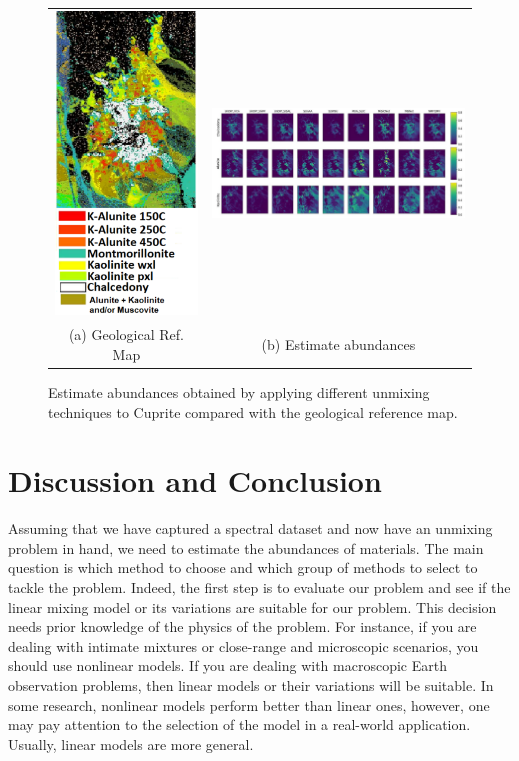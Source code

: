 \begin{figure}[h]
\centering
  \begin{tabular}{cc}
   \includegraphics[width=.14\textwidth]{fichiers_latex/Chap4/figs/Cuprite_GT_image3.pdf}&   \includegraphics[width=.75\textwidth]{fichiers_latex/Chap4/figs/Cuprite2.pdf}\\
 (a) Geological Ref. Map & (b) Estimate abundances
  \end{tabular}
  \caption{Estimate abundances obtained by applying different unmixing techniques to Cuprite compared with the geological reference map.}
\label{Real dataset}
\end{figure}

\section{Discussion and Conclusion}

Assuming that we have captured a spectral dataset and now have an unmixing problem in hand, we need to estimate the abundances of materials. The main question is which method to choose and which group of methods to select to tackle the problem. Indeed, the first step is to evaluate our problem and see if the linear mixing model or its variations are suitable for our problem. This decision needs prior knowledge of the physics of the problem. For instance, if you are dealing with intimate mixtures or close-range and microscopic scenarios, you should use nonlinear models. If you are dealing with macroscopic Earth observation problems, then linear models or their variations will be suitable. In some research, nonlinear models perform better than linear ones, however, one may pay attention to the selection of the model in a real-world application. Usually, linear models are more general. 

